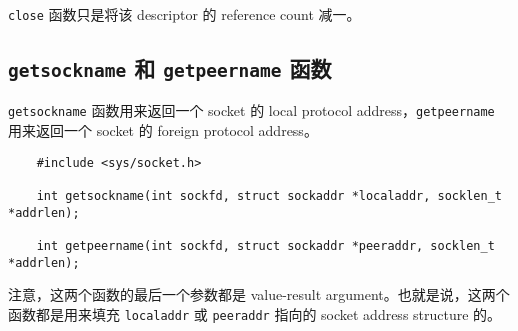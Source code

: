       \texttt{close} 函数只是将该 descriptor 的 reference count 减一。

  \subsection{\texttt{getsockname} 和 \texttt{getpeername} 函数}

    \texttt{getsockname} 函数用来返回一个 socket 的 local protocol address，\texttt{getpeername} 用来返回一个 socket 的 foreign protocol address。

    \begin{verbatim}
    #include <sys/socket.h>

    int getsockname(int sockfd, struct sockaddr *localaddr, socklen_t *addrlen);
      
    int getpeername(int sockfd, struct sockaddr *peeraddr, socklen_t *addrlen);
    \end{verbatim}

    注意，这两个函数的最后一个参数都是 value-result argument。也就是说，这两个函数都是用来填充 \texttt{localaddr} 或 \texttt{peeraddr} 指向的 socket address structure 的。
